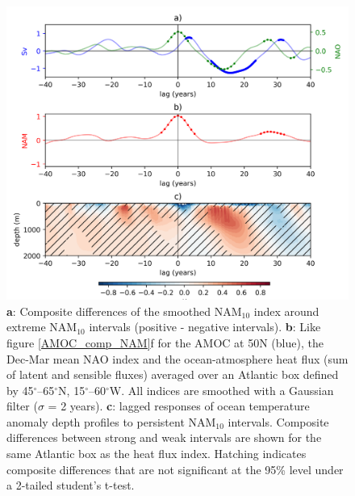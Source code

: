 \begin{figure}[h!]
\begin{center}
\noindent\includegraphics[width = \linewidth]{Figures/Figures-surface/Ocean_T_AMOC_NAO_responses.png} 
\caption{\textbf{a}: Composite differences of the smoothed NAM$_{10}$ index around extreme NAM$_{10}$ intervals (positive - negative intervals).
\textbf{b}: Like figure \ref{AMOC_comp_NAM}f for the AMOC at 50N (blue), the Dec-Mar mean NAO index and the ocean-atmosphere heat flux (sum of latent and sensible fluxes) averaged over an Atlantic box defined by 45$^{\circ}$–65$^{\circ}$N, 15$^{\circ}$–60$^{\circ}$W. All indices are smoothed with a Gaussian filter ($\sigma$ = 2 years). \textbf{c}: lagged responses of ocean temperature anomaly depth profiles to persistent NAM$_{10}$ intervals. Composite differences between strong and weak intervals are shown for the same Atlantic box as the heat flux index. Hatching indicates composite differences that are not significant at the 95\% level under a 2-tailed student's t-test.}
\label{NAO_AMOC_T_response}
\end{center}
\end{figure}

